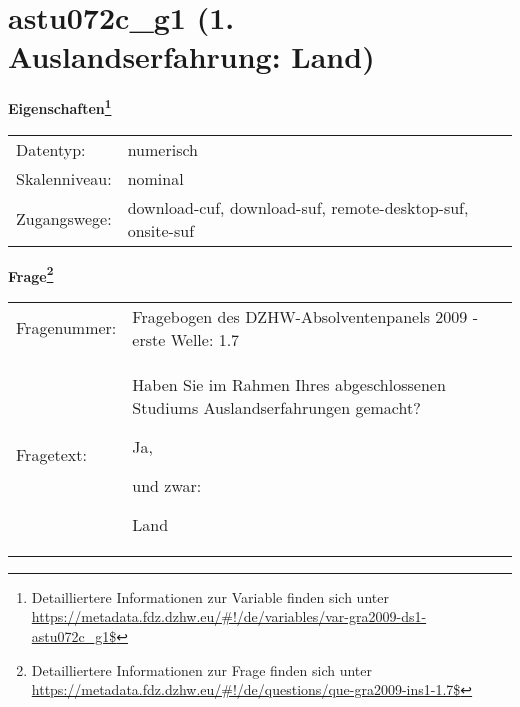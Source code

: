 
    \setcounter{footnote}{0}

    \vspace*{-1.8cm}
	\section{astu072c\_g1 (1. Auslandserfahrung: Land)}
	\label{section:astu072c_g1}



    \vspace*{0.5cm}
    \noindent\textbf{Eigenschaften\footnote{Detailliertere Informationen zur Variable finden sich unter
		\url{https://metadata.fdz.dzhw.eu/\#!/de/variables/var-gra2009-ds1-astu072c_g1$}}}\\
	\begin{tabularx}{\hsize}{@{}lX}
	Datentyp: & numerisch \\
	Skalenniveau: & nominal \\
	Zugangswege: &
	  download-cuf, 
	  download-suf, 
	  remote-desktop-suf, 
	  onsite-suf
 \\
    \end{tabularx}



				\vspace*{0.5cm}
                \noindent\textbf{Frage\footnote{Detailliertere Informationen zur Frage finden sich unter
		              \url{https://metadata.fdz.dzhw.eu/\#!/de/questions/que-gra2009-ins1-1.7$}}}\\
				\begin{tabularx}{\hsize}{@{}lX}
					Fragenummer: &
					  Fragebogen des DZHW-Absolventenpanels 2009 - erste Welle:
					  1.7
 \\
					Fragetext: & Haben Sie im Rahmen Ihres abgeschlossenen Studiums Auslandserfahrungen gemacht?\par  Ja,\par  und zwar:\par  Land \\
				\end{tabularx}





